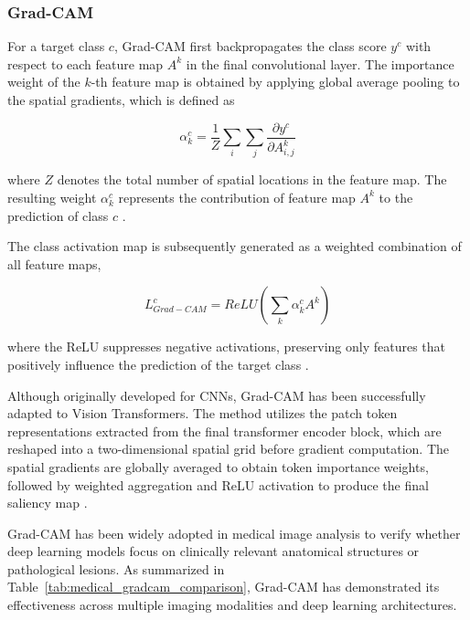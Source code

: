\subsubsection{Grad-CAM}

For a target class $c$, Grad-CAM first backpropagates the class score $y^c$ with respect to each feature map $A^k$ in the final convolutional layer.
The importance weight of the $k$-th feature map is obtained by applying global average pooling to the spatial gradients, which is defined as

\begin{equation}
\alpha_{k}^{c} = \frac{1}{Z} \sum_{i} \sum_{j} \frac{\partial y^{c}}{\partial A_{i,j}^{k}}
\label{eq:grad_cam_weights}
\end{equation}

where $Z$ denotes the total number of spatial locations in the feature map.
The resulting weight $\alpha_k^c$ represents the contribution of feature map $A^k$ to the prediction of class $c$ \cite{Selvaraju2020}.

The class activation map is subsequently generated as a weighted combination of all feature maps,

\begin{equation}
    L_{Grad-CAM}^{c} = ReLU (\sum_{k} \alpha_{k}^{c} A^{k})
    \label{eq:grad_cam_activation_map}
\end{equation}

where the ReLU suppresses negative activations, preserving only features that positively influence the prediction of the target class \cite{Selvaraju2020}.

Although originally developed for CNNs, Grad-CAM has been successfully adapted to Vision Transformers.
The method utilizes the patch token representations extracted from the final transformer encoder block, which are reshaped into a two-dimensional spatial grid before gradient computation.
The spatial gradients are globally averaged to obtain token importance weights, followed by weighted aggregation and ReLU activation to produce the final saliency map \cite{Alhafdhi2026, Vanitha2025}.

Grad-CAM has been widely adopted in medical image analysis to verify whether deep learning models focus on clinically relevant anatomical structures or pathological lesions.
As summarized in Table~\ref{tab:medical_gradcam_comparison}, Grad-CAM has demonstrated its effectiveness across multiple imaging modalities and deep learning architectures.


